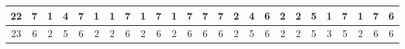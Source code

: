\begin{sidewaystable}[]
\begin{tabular}{|c|c|c|c|c|c|c|c|c|c|c|c|c|c|c|c|c|c|c|c|c|c|c|c|c|}
    22      & 7                                               & 1                                               & 4                                               & 7                                               & 1                                               & 1                                               & 7                                               & 1                                               & 7                                               & 1                                                & 7                                                & 7                                                & 7                                               & 2                                               & 4                                               & 6                                               & 2                                               & 2                                               & 5                                               & 1                                                 & 7                                               & 1                                                & 7                                                & 6                                                \\ \hline
    23      & 6                                               & 2                                               & 5                                               & 6                                               & 2                                               & 2                                               & 6                                               & 2                                               & 6                                               & 2                                                & 6                                                & 6                                                & 6                                               & 2                                               & 5                                               & 6                                               & 2                                               & 2                                               & 5                                               & 3                                                 & 5                                               & 2                                                & 6                                                & 6                                                \\ \hline

\end{tabular}
\end{sidewaystable}
